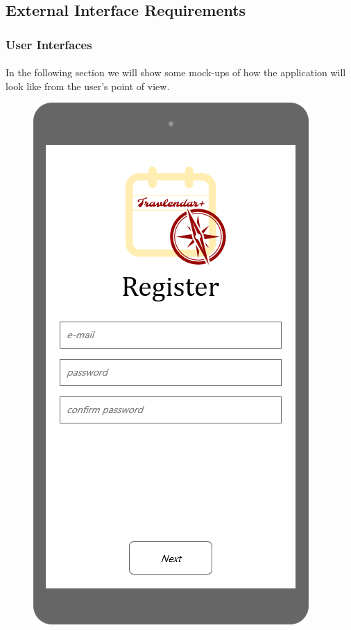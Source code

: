 \documentclass{article}
\begin{document}
\subsection{External Interface Requirements}
\subsubsection{User Interfaces}
\paragraph{}
In the following section we will show some mock-ups of how the application will look like from the user's point of view.
\begin{figure}[H]
  \includegraphics[width=\linewidth]{01-email_and_password.png}

\end{figure}
\end{document}
